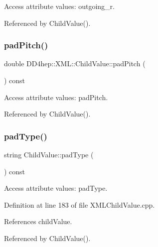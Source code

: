 Access attribute values\+: outgoing\+\_\+r. 



Referenced by Child\+Value().

\hypertarget{struct_d_d4hep_1_1_x_m_l_1_1_child_value_a5e1c0a5f057ea795316f5281f2ae2424}{}\label{struct_d_d4hep_1_1_x_m_l_1_1_child_value_a5e1c0a5f057ea795316f5281f2ae2424} 
\subsubsection{\texorpdfstring{pad\+Pitch()}{padPitch()}}
{\footnotesize\ttfamily double D\+D4hep\+::\+X\+M\+L\+::\+Child\+Value\+::pad\+Pitch (\begin{DoxyParamCaption}{ }\end{DoxyParamCaption}) const}



Access attribute values\+: pad\+Pitch. 



Referenced by Child\+Value().

\hypertarget{struct_d_d4hep_1_1_x_m_l_1_1_child_value_ab642904dce35b222931f1521c360f21a}{}\label{struct_d_d4hep_1_1_x_m_l_1_1_child_value_ab642904dce35b222931f1521c360f21a} 
\subsubsection{\texorpdfstring{pad\+Type()}{padType()}}
{\footnotesize\ttfamily string Child\+Value\+::pad\+Type (\begin{DoxyParamCaption}{ }\end{DoxyParamCaption}) const}



Access attribute values\+: pad\+Type. 



Definition at line 183 of file X\+M\+L\+Child\+Value.\+cpp.



References child\+Value.



Referenced by Child\+Value().

